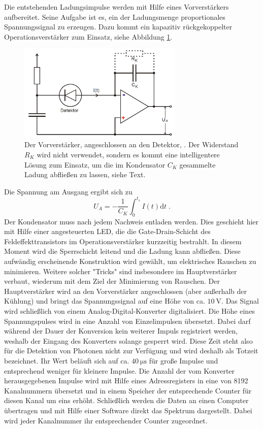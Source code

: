 Die entstehenden Ladungsimpulse werden mit Hilfe eines Vorverstärkers aufbereitet. Seine Aufgabe ist es, ein der Ladungsmenge proportionales Spannungssignal zu erzeugen. Dazu kommt ein kapazitiv rückgekoppelter Operationsverstärker zum Einsatz, siehe Abbildung \ref{fig:vv}.
\begin{figure}
  \centering
  \includegraphics[width=0.7\textwidth]{ressources/vorverstaerker.png}
  \caption{Der Vorverstärker, angeschlossen an den Detektor, \cite{skript}. Der Widerstand $R_K$ wird nicht verwendet, sondern es kommt eine intelligentere Lösung zum Einsatz, um die im Kondensator $C_K$ gesammelte Ladung abfließen zu lassen, siehe Text.}
  \label{fig:vv}
\end{figure}
Die Spannung am Ausgang ergibt sich zu
\begin{equation}
  U_A = -\frac{1}{C_K}\int_0^{t_s}I(t)\text{d}t  \; .
  \label{eq:vvspannung}
\end{equation}
Der Kondensator muss nach jedem Nachweis entladen werden. Dies geschieht hier mit Hilfe einer angesteuerten LED, die die Gate-Drain-Schicht des Feldeffekttransistors im Operationsverstärker kurzzeitig bestrahlt. In diesem Moment wird die Sperrschicht leitend und die Ladung kann abfließen. Diese aufwändig erscheinende Konstruktion wird gewählt, um elektrisches Rauschen zu minimieren. Weitere solcher "Tricks" sind insbesondere im Hauptverstärker verbaut, wiederum mit dem Ziel der Minimierung von Rauschen. Der Hauptverstärker wird an den Vorverstärker angeschlossen (aber außerhalb der Kühlung) und bringt das Spannungssignal auf eine Höhe von ca. $\SI{10}{\volt}$. Das Signal wird schließlich von einem Analog-Digital-Konverter digitalisiert. Die Höhe eines Spannungspulses wird in eine Anzahl von Einzelimpulsen übersetzt. Dabei darf während der Dauer der Konversion kein weiterer Impuls registriert werden, weshalb der Eingang des Konverters solange gesperrt wird. Diese Zeit steht also für die Detektion von Photonen nicht zur Verfügung und wird deshalb als Totzeit bezeichnet. Ihr Wert beläuft sich auf ca. $\SI{40}{\micro\second}$ für große Impulse und entsprechend weniger für kleinere Impulse. Die Anzahl der vom Konverter herausgegebenen Impulse wird mit Hilfe eines Adressregisters in eine von 8192 Kanalnummern übersetzt und in einem Speicher  der entsprechende Counter für diesen Kanal um eins erhöht. Schließlich werden die Daten an einen Computer übertragen und mit Hilfe einer Software direkt das Spektrum dargestellt. Dabei wird jeder Kanalnummer ihr entsprechender Counter zugeordnet.
